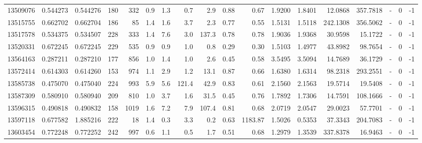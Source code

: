 \begin{tabular}{rrrrrrrrrrrrrrrlrr}
  13509076 & 0.544273 &   0.544276 &  180 &  332 &      0.9 &      1.3 &     0.7 &      2.9 &       0.88 &        0.67 &  1.9200 &  1.8401 &   12.0868 &  357.7818 &             - &        0 &         -1 \\
  13515755 & 0.662702 &   0.662704 &  186 &   85 &      1.4 &      1.6 &     3.7 &      2.3 &       0.77 &        0.55 &  1.5131 &  1.5118 &  242.1308 &  356.5062 &             - &        0 &         -1 \\
  13517578 & 0.534375 &   0.534507 &  228 &  333 &      1.4 &      7.6 &     3.0 &    137.3 &       0.78 &        0.78 &  1.9036 &  1.9368 &   30.9598 &   15.1722 &             - &        0 &         -1 \\
  13520331 & 0.672245 &   0.672245 &  229 &  535 &      0.9 &      0.9 &     1.0 &      0.8 &       0.29 &        0.30 &  1.5103 &  1.4977 &   43.8982 &   98.7654 &             - &        0 &         -1 \\
  13564163 & 0.287211 &   0.287210 &  177 &  856 &      1.0 &      1.4 &     1.0 &      2.6 &       0.45 &        0.58 &  3.5495 &  3.5094 &   14.7689 &   36.1729 &             - &        0 &         -1 \\
  13572414 & 0.614303 &   0.614260 &  153 &  974 &      1.1 &      2.9 &     1.2 &     13.1 &       0.87 &        0.66 &  1.6380 &  1.6314 &   98.2318 &  293.2551 &             - &        0 &         -1 \\
  13585738 & 0.475070 &   0.475040 &  224 &  993 &      5.9 &      5.6 &   121.4 &     42.9 &       0.83 &        0.61 &  2.1560 &  2.1563 &   19.5714 &   19.5408 &             - &        0 &         -1 \\
  13587309 & 0.580910 &   0.580940 &  209 &  810 &      1.0 &      3.7 &     1.6 &     31.5 &       0.45 &        0.76 &  1.7892 &  1.7306 &   14.7591 &  108.1666 &             - &        0 &         -1 \\
  13596315 & 0.490818 &   0.490832 &  158 & 1019 &      1.6 &      7.2 &     7.9 &    107.4 &       0.81 &        0.68 &  2.0719 &  2.0547 &   29.0023 &   57.7701 &             - &        0 &         -1 \\
  13597118 & 0.677582 &   1.885216 &  222 &   18 &      1.4 &      0.3 &     3.3 &      0.2 &       0.63 &     1183.87 &  1.5026 &  0.5353 &   37.3343 &  204.7083 &             - &        0 &         -1 \\
  13603454 & 0.772248 &   0.772252 &  242 &  997 &      0.6 &      1.1 &     0.5 &      1.7 &       0.51 &        0.68 &  1.2979 &  1.3539 &  337.8378 &   16.9463 &             - &        0 &         -1 \\

\end{tabular}

